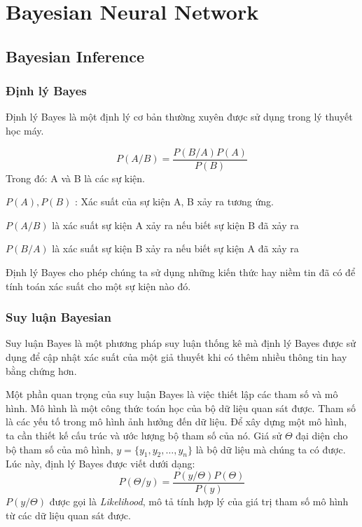 


\chapter{Bayesian Neural Network}

\pagebreak

\section{Bayesian Inference}
\subsection{Định lý Bayes}
Định lý Bayes là một định lý cơ bản thường xuyên được sử dụng trong lý thuyết học máy.

\begin{equation}
	P(A/B) = \frac{P(B/A)P(A)}{P(B)}
\end{equation}
Trong đó: 
A và B là các sự kiện.

$P(A), P(B)$ : Xác suất của sự kiện A, B xảy ra tương ứng.

$P(A/B)$ là xác suất sự kiện A xảy ra nếu biết sự kiện B đã xảy ra

$P(B/A)$ là xác suất sự kiện B xảy ra nếu biết sự kiện A đã xảy ra

Định lý Bayes cho phép chúng ta sử dụng những kiến thức hay niềm tin đã có để tính toán xác suất cho một sự kiện nào đó.
\subsection{Suy luận Bayesian}
Suy luận Bayes là một phương pháp suy luận thống kê mà định lý Bayes được sử dụng để cập nhật xác suất của một giả thuyết khi có thêm nhiều thông tin hay bằng chứng hơn. 

Một phần quan trọng của suy luận Bayes là việc thiết lập các tham số và mô hình. Mô hình là một công thức toán học của bộ dữ liệu quan sát được. Tham số là các yếu tố trong mô hình ảnh hưởng đến dữ liệu.
Để xây dựng một mô hình, ta cần thiết kế cấu trúc và ước lượng bộ tham số của nó.
Giá sử $\Theta$ đại diện cho bộ tham số của mô hình, $y = \{y_1, y_2, \dots, y_n \}$ là bộ dữ liệu mà chúng ta có được. Lúc này, định lý Bayes được viết dưới dạng:
\begin{equation}
P(\Theta/y) = \frac{P(y/\Theta)P(\Theta)}{P(y)}
\end{equation}
$P(y/\Theta)$ được gọi là \textit{Likelihood}, mô tả tính hợp lý của giá trị tham số mô hình từ các dữ liệu quan sát được.

